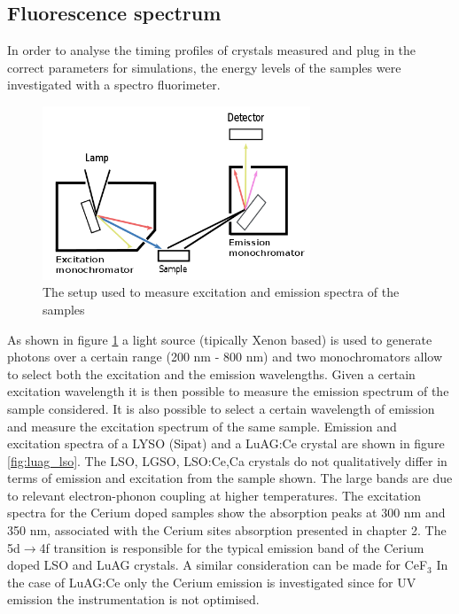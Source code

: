 \subsection{Fluorescence spectrum}
In order to analyse the timing profiles of crystals measured and plug in the correct parameters for simulations, 
the energy levels of the samples were investigated with a spectro fluorimeter.
\begin{figure}[htbp]
\begin{center}
\includegraphics[width=8cm]{../Pictures/Chapter_5/fluo.png}
\end{center}
\caption[Spectro fluorimeter]{The setup used to measure excitation and emission spectra of the samples}
\label{fig:emission}
\end{figure}
 
As shown in figure \ref{fig:emission} a light source (tipically Xenon based) is used to generate photons over a certain range (200 nm - 800 nm) and two monochromators allow to select both the excitation and the emission wavelengths. 
Given a certain excitation wavelength it is then possible to measure the emission spectrum of the sample considered.
It is also possible to select a certain wavelength of emission and measure the excitation spectrum of the same sample.
Emission and excitation spectra of a LYSO (Sipat) and a LuAG:Ce crystal are shown in figure \ref{fig:luag_lso}.
The LSO, LGSO, LSO:Ce,Ca crystals do not qualitatively differ in terms of emission and excitation from the sample shown. 
The large bands are due to relevant electron-phonon coupling at higher temperatures.
The excitation spectra for the Cerium doped samples show the absorption peaks at 300 nm and 350 nm, associated with the Cerium sites absorption presented in chapter 2. The 5d$\rightarrow$4f transition is responsible for the typical emission band of the Cerium doped LSO and LuAG crystals. 
A similar consideration can be made for CeF$_{3}$
In the case of LuAG:Ce only the Cerium emission is investigated since for UV emission the instrumentation is not optimised.

